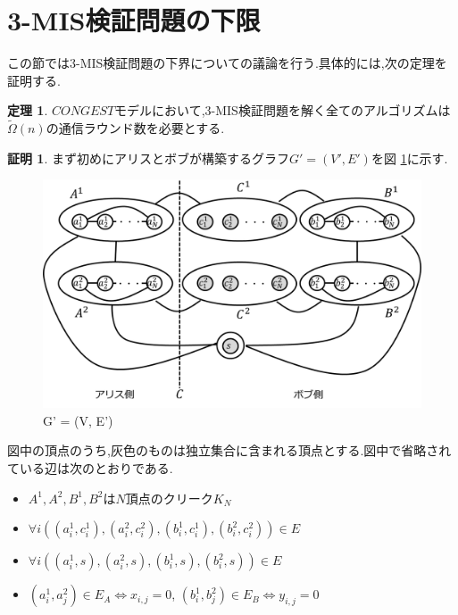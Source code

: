 \documentclass[12]{thesis}
\theoremstyle{definition}
\newtheorem{theorem}{定理}[chapter]
\newtheorem*{prf*}{証明}
\begin{document}
\section{3-MIS検証問題の下限}
この節では3-MIS検証問題の下界についての議論を行う.具体的には,次の定理を証明する.
\begin{theorem}
$CONGEST$モデルにおいて,3-MIS検証問題を解く全てのアルゴリズムは$\tilde{\Omega} (n)$の通信ラウンド数を必要とする.
\end{theorem}

\begin{prf*}
まず初めにアリスとボブが構築するグラフ$G' = (V', E')$を図 \ref{3MIS}に示す. 

\begin{figure}[ht]
\begin{center}
\includegraphics[width=120mm]{3MIS.png}
\end{center}
\caption{G' = (V, E')}
\label{3MIS}
\end{figure}

図中の頂点のうち,灰色のものは独立集合に含まれる頂点とする.図中で省略されている辺は次のとおりである.
\begin{itemize}
\item $A^{1}, A^{2}, B^{1}, B^{2}$は$N$頂点のクリーク$K_{N}$
\item $\forall i((a_{i}^{1}, c_{i}^{1}), (a_{i}^{2}, c_{i}^{2}), (b_{i}^{1}, c_{i}^{1}), (b_{i}^{2}, c_{i}^{2})) \in E$
\item $\forall i((a_{i}^{1}, s), (a_{i}^{2}, s), (b_{i}^{1}, s), (b_{i}^{2}, s)) \in E$
\item $(a_{i}^{1}, a_{j}^{2}) \in E_{A} \Leftrightarrow x_{i, j} = 0$, $(b_{i}^{1}, b_{j}^{2}) \in E_{B} \Leftrightarrow y_{i, j} = 0$
\end{itemize}


\end{prf*}
\end{document}
